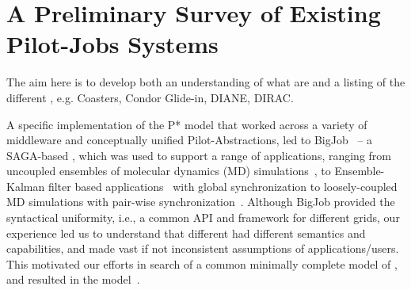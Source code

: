 \documentclass{sig-alternate}
\begin{document}

\section{A Preliminary Survey of Existing Pilot-Jobs Systems}
\label{sec:survey}


The aim here is to develop both an understanding of what \pilotjobs
are and a listing of the different \pilotjobs, e.g. Coasters, Condor
Glide-in, DIANE, DIRAC.

A specific implementation of the P* model that worked across a variety of middleware and conceptually unified Pilot-Abstractions, led to 
BigJob~\cite{saga_bigjob_condor_cloud} -- a
SAGA-based \pilotjob, which was used to support a range of
applications, ranging from uncoupled ensembles of molecular dynamics
(MD) simulations~\cite{saga_bigjob_condor_cloud}, to Ensemble-Kalman
filter based applications~\cite{gmac09} with global synchronization to
loosely-coupled MD simulations with pair-wise
synchronization~\cite{async_repex11}.  Although BigJob provided the
syntactical uniformity, i.e., a common API and framework for different
grids, our experience led us to understand that different \pilotjobs
had different semantics and capabilities, and made vast if not
inconsistent assumptions of applications/users. This motivated our
efforts in search of a common minimally complete model of \pilotjobs,
and resulted in the \pstar model~\cite{pstar12}. 
\end{document}
